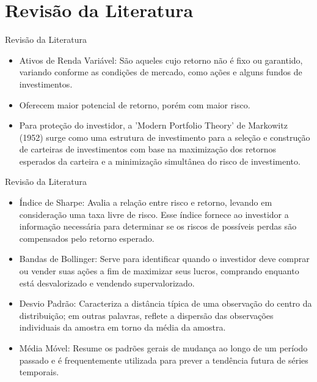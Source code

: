 \documentclass[aspectratio=169]{beamer}
\begin{document}
\section{Revisão da Literatura}
\begin{frame}{Revisão da Literatura}
  \begin{itemize}
    \item Ativos de Renda Variável: São aqueles cujo retorno não é fixo ou garantido, variando conforme as condições de mercado, como ações e alguns fundos de investimentos.

    \item Oferecem maior potencial de retorno, porém com maior risco.

    \item Para proteção do investidor, a 'Modern Portfolio Theory'
    de Markowitz (1952) surge como uma estrutura de investimento para a seleção e
    construção de carteiras de investimentos com base na maximização dos retornos esperados da carteira e a minimização simultânea do risco de investimento. \cite{mangram2013simplified}
    
  \end{itemize}
\end{frame}

\begin{frame}{Revisão da Literatura}
  \begin{itemize}
    \item Índice de Sharpe: Avalia a relação entre risco e retorno, levando em consideração uma taxa livre de risco. Esse índice fornece ao investidor a informação necessária para determinar se os riscos de possíveis perdas são compensados pelo retorno esperado. \cite{de2015fundos}

    \item Bandas de Bollinger: Serve para identificar quando o investidor deve comprar ou vender suas ações a fim de maximizar seus lucros, comprando enquanto está desvalorizado e vendendo supervalorizado. \cite{yan2023enhanced}

    \item Desvio Padrão: Caracteriza a distância típica de uma observação do centro da distribuição; em outras palavras, reflete a dispersão das observações individuais da amostra em torno da média da amostra. \cite{curran1998fundamental}

    \item Média Móvel: Resume os padrões gerais de mudança ao longo de um período passado e é frequentemente utilizada para prever a tendência futura de séries temporais. \cite{su2022self}

  \end{itemize}
\end{frame}
\end{document}
